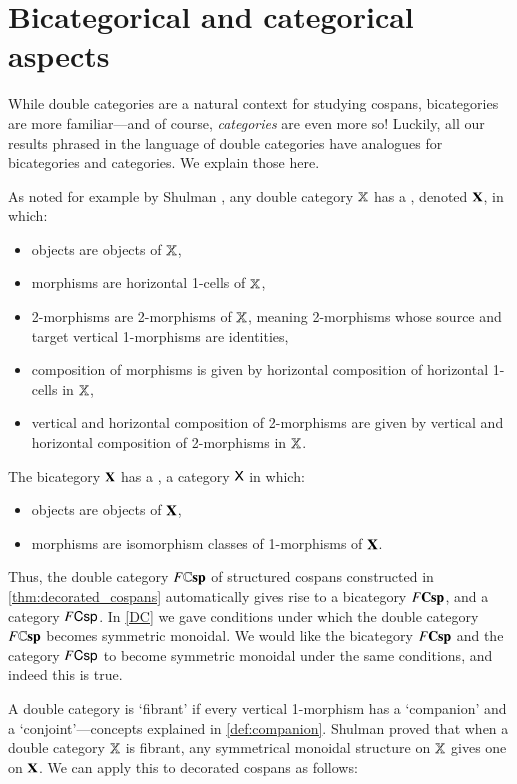 \documentclass[reqno]{amsart}
\begin{document}
\section{Bicategorical and categorical aspects}
\label{spinoffs}

While double categories are a natural context for studying cospans, bicategories are more 
familiar---and of course, \emph{categories} are even more so!   Luckily, all our results 
phrased in the language of double categories have analogues for bicategories and categories.  
We explain those here.

As noted for example by Shulman \cite{Shulman2010}, any double category $\mathbf{\mathbb X}$ has a 
, denoted $\mathbf{X}$, in which:
\begin{itemize}
\item objects are objects of $\mathbf{\mathbb X}$,
\item morphisms are horizontal 1-cells of $\mathbf{\mathbb X}$,
\item 2-morphisms are  2-morphisms of $\mathbf{\mathbb X}$, meaning 2-morphisms whose source and target vertical 1-morphisms are identities,
\item composition of morphisms is given by horizontal composition of horizontal 1-cells in $\mathbf{\mathbb X}$,
\item vertical and horizontal composition of 2-morphisms are given by vertical and horizontal
composition of 2-morphisms in $\mathbf{\mathbb X}$.
\end{itemize}
The bicategory $\mathbf{X}$ has a , a category $\mathsf{X}$ in which:
\begin{itemize}
\item objects are objects of $\mathbf{X}$,
\item morphisms are isomorphism classes of 1-morphisms of $\mathbf{X}$.   
\end{itemize}
Thus, the double category $F\mathbf{\mathbb Csp}$ of structured cospans constructed in \cref{thm:decorated_cospans} automatically gives rise to a bicategory $F\mathbf{Csp}$, and a category $F\mathsf{Csp}$.   In \cref{DC} we gave conditions under which the double category $F\mathbf{\mathbb Csp}$ becomes symmetric monoidal.   We would like the bicategory $F\mathbf{Csp}$ and the category $F\mathsf{Csp}$ to become symmetric monoidal under the same conditions, and indeed this is true.   

A double category is `fibrant' if every vertical 1-morphism has a `companion' and a `conjoint'---concepts explained in \cref{def:companion}.   Shulman \cite[Thm.\ 1.2]{Shulman2010} proved that when a double category $\mathbf{\mathbb X}$ is fibrant, any symmetrical monoidal structure on $\mathbf{\mathbb X}$ gives one on $\mathbf{X}$.    We can apply this to decorated cospans as follows:
\end{document}
